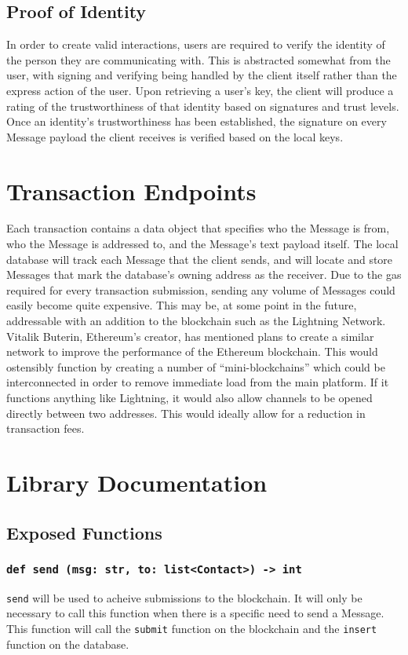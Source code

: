 \documentclass[]{article}
\begin{document}
\subsection{Proof of Identity}
In order to create valid interactions, users are required to verify the identity of the person they are communicating with. This is abstracted somewhat from the user, with signing and verifying being handled by the client itself rather than the express action of the user. Upon retrieving a user's key, the client will produce a rating of the trustworthiness of that identity based on signatures and trust levels. Once an identity's trustworthiness has been established, the signature on every Message payload the client receives is verified based on the local keys.

\section{Transaction Endpoints}
Each transaction contains a data object that specifies who the Message is from, who the Message is addressed to, and the Message's text payload itself. The local database will track each Message that the client sends, and will locate and store Messages that mark the database's owning address as the receiver. Due to the gas required for every transaction submission, sending any volume of Messages could easily become quite expensive. This may be, at some point in the future, addressable with an addition to the blockchain such as the Lightning Network. Vitalik Buterin, Ethereum's creator, has mentioned plans to create a similar network to improve the performance of the Ethereum blockchain. This would ostensibly function by creating a number of ``mini-blockchains'' which could be interconnected in order to remove immediate load from the main platform. If it functions anything like Lightning, it would also allow channels to be opened directly between two addresses. This would ideally allow for a reduction in transaction fees.

\section{Library Documentation}

\subsection{Exposed Functions}
\subsubsection{\texttt{def send (msg: str, to: list<Contact>) -> int}}
\texttt{send} will be used to acheive submissions to the blockchain. It will only be necessary to call this function when there is a specific need to send a Message. This function will call the \texttt{submit} function on the blockchain and the \texttt{insert} function on the database.
\end{document}

